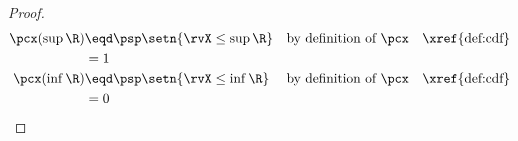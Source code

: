\begin{theorem}
\label{thm:cdf}
\end{theorem}
\begin{proof}
\begin{align*}
  \pcx(\sup\R)
    &\eqd \psp\setn{\rvX\le\sup\R} 
    && \text{by definition of $\pcx$} 
    &&\text{\xref{def:cdf}}
  \\&=    1                  
  \\
  \pcx(\inf\R)
    &\eqd \psp\setn{\rvX\le\inf\R} 
    && \text{by definition of $\pcx$} &&\text{\xref{def:cdf}}
  \\&=    0                  
\end{align*}
\end{proof}

